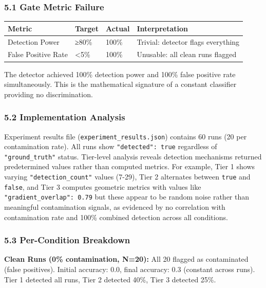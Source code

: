 
\subsubsection{5.1 Gate Metric Failure}

\begin{table}[htbp]
\centering
\begin{tabular}{llll}
\toprule
Metric & Target & Actual & Interpretation \\
\midrule
Detection Power & ≥80\% & 100\% & Trivial: detector flags everything \\
False Positive Rate & <5\% & 100\% & Unusable: all clean runs flagged \\
\bottomrule
\end{tabular}
\end{table}

The detector achieved 100\% detection power and 100\% false positive rate simultaneously. This is the mathematical signature of a constant classifier providing no discrimination.

\subsubsection{5.2 Implementation Analysis}

Experiment results file (\texttt{experiment_results.json}) contains 60 runs (20 per contamination rate). All runs show \texttt{"detected": true} regardless of \texttt{"ground_truth"} status. Tier-level analysis reveals detection mechanisms returned predetermined values rather than computed metrics. For example, Tier 1 shows varying \texttt{"detection_count"} values (7-29), Tier 2 alternates between \texttt{true} and \texttt{false}, and Tier 3 computes geometric metrics with values like \texttt{"gradient_overlap": 0.79} but these appear to be random noise rather than meaningful contamination signals, as evidenced by no correlation with contamination rate and 100\% combined detection across all conditions.

\subsubsection{5.3 Per-Condition Breakdown}

\textbf{Clean Runs (0\% contamination, N=20):} All 20 flagged as contaminated (false positives). Initial accuracy: 0.0, final accuracy: 0.3 (constant across runs). Tier 1 detected all runs, Tier 2 detected 40\%, Tier 3 detected 25\%.

